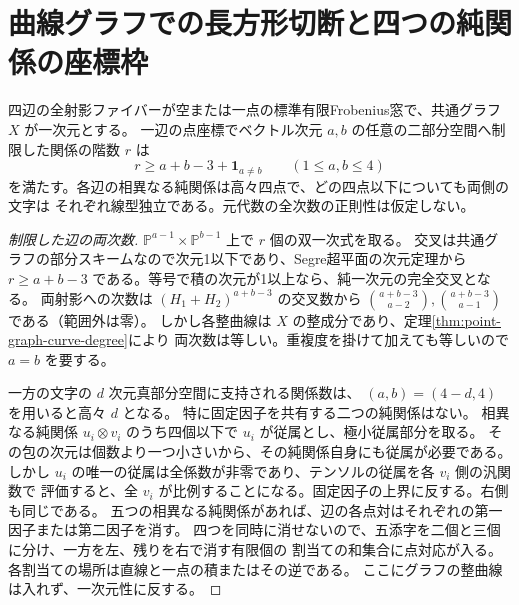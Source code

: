 \section{曲線グラフでの長方形切断と四つの純関係の座標枠}
\label{sec:curve-graph-pure-frames}
\begin{theorem}\label{thm:curve-graph-pure-frames}
四辺の全射影ファイバーが空または一点の標準有限Frobenius窓で、共通グラフ $X$ が一次元とする。
一辺の点座標でベクトル次元 $a,b$ の任意の二部分空間へ制限した関係の階数 $r$ は
\[
        r\ge a+b-3+\mathbf1_{a\ne b}\qquad(1\le a,b\le4)
\]
を満たす。各辺の相異なる純関係は高々四点で、どの四点以下についても両側の文字は
それぞれ線型独立である。元代数の全次数の正則性は仮定しない。
\end{theorem}
\begin{proof}[制限した辺の両次数]
$\mathbb P^{a-1}\times\mathbb P^{b-1}$ 上で $r$ 個の双一次式を取る。
交叉は共通グラフの部分スキームなので次元1以下であり、Segre超平面の次元定理から
$r\ge a+b-3$ である。等号で積の次元が1以上なら、純一次元の完全交叉となる。
両射影への次数は $(H_1+H_2)^{a+b-3}$ の交叉数から
$\binom{a+b-3}{a-2},\binom{a+b-3}{a-1}$ である（範囲外は零）。
しかし各整曲線は $X$ の整成分であり、定理\ref{thm:point-graph-curve-degree}により
両次数は等しい。重複度を掛けて加えても等しいので $a=b$ を要する。

一方の文字の $d$ 次元真部分空間に支持される関係数は、
$(a,b)=(4-d,4)$ を用いると高々 $d$ となる。
特に固定因子を共有する二つの純関係はない。
相異なる純関係 $u_i\otimes v_i$ のうち四個以下で $u_i$ が従属とし、極小従属部分を取る。
その包の次元は個数より一つ小さいから、その純関係自身にも従属が必要である。
しかし $u_i$ の唯一の従属は全係数が非零であり、テンソルの従属を各 $v_i$ 側の汎関数で
評価すると、全 $v_i$ が比例することになる。固定因子の上界に反する。右側も同じである。
五つの相異なる純関係があれば、辺の各点対はそれぞれの第一因子または第二因子を消す。
四つを同時に消せないので、五添字を二個と三個に分け、一方を左、残りを右で消す有限個の
割当ての和集合に点対応が入る。各割当ての場所は直線と一点の積またはその逆である。
ここにグラフの整曲線は入れず、一次元性に反する。
\end{proof}

